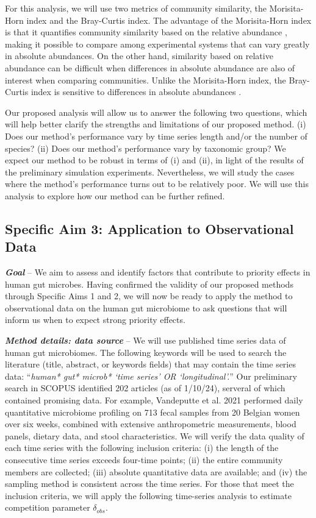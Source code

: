 \documentclass[12pt, class=article, crop=false]{standalone}
\begin{document}
For this analysis, we will use two metrics of community similarity, the Morisita-Horn index and the Bray-Curtis index.
The advantage of the Morisita-Horn index is that it quantifies community similarity based on the relative abundance \citep{magurran_biological_2011}, making it possible to compare among experimental systems that can vary greatly in absolute abundances.
On the other hand, similarity based on relative abundance can be difficult when differences in absolute abundance are also of interest when comparing communities.
Unlike the Morisita-Horn index, the Bray-Curtis index is sensitive to differences in absolute abundances \citep{magurran_biological_2011}.

Our proposed analysis will allow us to answer the following two questions, which will help better clarify the strengths and limitations of our proposed method.
(i) Does our method's performance vary by time series length and/or the number of species?
(ii) Does our method's performance vary by taxonomic group?
We expect our method to be robust in terms of (i) and (ii), in light of the results of the preliminary simulation experiments.
Nevertheless, we will study the cases where the method's performance turns out to be relatively poor.
We will use this analysis to explore how our method can be further refined.

\subsection*{Specific Aim 3: Application to Observational Data}

\textbf{\textit{Goal}} -- 
We aim to assess and identify factors that contribute to priority effects in human gut microbes.
Having confirmed the validity of our proposed methods through Specific Aims 1 and 2, we will now be ready to apply the method to observational data on the human gut microbiome to ask questions that will inform us when to expect strong priority effects.

\textit{\textbf{Method details: data source}} --
We will use published time series data of human gut microbiomes.
The following keywords will be used to search the literature (title, abstract, or keywords fields) that may contain the time series data: ``\textit{human* gut* microb* `time series' OR `longitudinal'.}''
Our preliminary search in SCOPUS identified 202 articles (as of 1/10/24), serveral of which contained promising data.
For example, Vandeputte et al. 2021 \citep{vandeputte_temporal_2021} performed daily quantitative microbiome profiling on 713 fecal samples from 20 Belgian women over six weeks, combined with extensive anthropometric measurements, blood panels, dietary data, and stool characteristics. 
We will verify the data quality of each time series with the following inclusion criteria: (i) the length of the consecutive time series exceeds four-time points; (ii) the entire community members are collected; (iii) absolute quantitative data are available; and (iv) the sampling method is consistent across the time series.
For those that meet the inclusion criteria, we will apply the following time-series analysis to estimate competition parameter $\delta_{obs}$.
\end{document}

